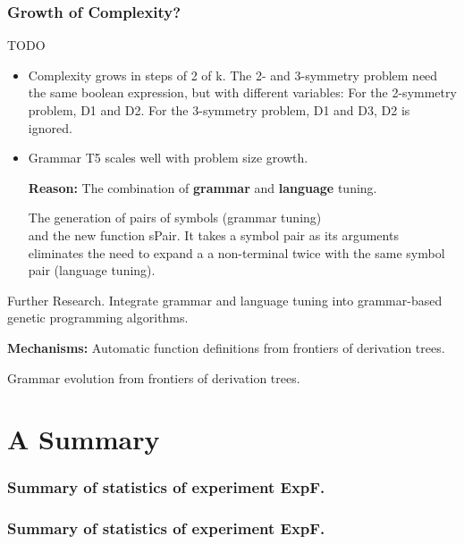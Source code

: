 \documentclass[18pt,c]{beamer}
\begin{document}
\begin{frame}
\frametitle{
Growth of Complexity?
}
TODO \begin{itemize}
\item Complexity grows in steps of 2 of k.
       The 2- and 3-symmetry problem need the same boolean expression,
       but with different variables:
       For the 2-symmetry problem, D1 and D2.
       For the 3-symmetry problem, D1 and D3,
       D2 is ignored.
\item Grammar T5 scales well with problem size growth.
 
  {\bf Reason:} The combination of {\bf grammar} and
        {\bf language} tuning.
 
The generation of pairs of symbols
                 (grammar tuning) \\
  and the new function sPair. It takes a 
  symbol pair as its arguments eliminates the need to expand a 
  a non-terminal twice with the same symbol pair
  (language tuning).
\end{itemize}
\end{frame}%
\begin{frame}
\vspace*{2mm}
\begin{block}{
Further Research.
}
Integrate grammar and language tuning
into grammar-based genetic programming algorithms.
  
{\bf Mechanisms:}
Automatic function definitions from frontiers of derivation trees.
 
Grammar evolution from frontiers of derivation trees.
\end{block}
\end{frame}%
\clearpage
\section{A Summary}
 \begin{frame}
 \fontsize{8pt}{9pt}\selectfont
 \frametitle{ Summary of statistics of experiment ExpF. }

 \label{ExpFStatsTable003.tex}  
 \end{frame}

 \begin{frame}
 \fontsize{8pt}{9pt}\selectfont
 \frametitle{ Summary of statistics of experiment ExpF. }

 \label{ExpFStatsTable004.tex}  
 \end{frame}
\end{document}
